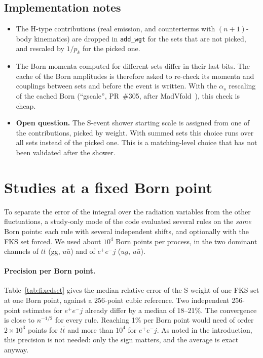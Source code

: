 \documentclass[11pt,a4paper]{article}
\newcommand{\code}[1]{\texttt{#1}}
\begin{document}
\subsection{Implementation notes}
\begin{itemize}
\item The H-type contributions (real emission, and counterterms with $(n{+}1)$-body kinematics)
are dropped in \code{add\_wgt} for the sets that are not picked, and rescaled by $1/p_k$ for
the picked one.
\item The Born momenta computed for different sets differ in their last bits. The cache of
the Born amplitudes is therefore asked to re-check its momenta and couplings between sets
and before the event is written. With the $\alpha_s$ rescaling of the cached Born
(``gscale'', PR~\#305, after MadVfold~\cite{Valassi:2026pgd}), this check is cheap.
\item \textbf{Open question.} The S-event shower starting scale is assigned from one of the
contributions, picked by weight. With summed sets this choice runs over all sets instead of
the picked one. This is a matching-level choice that has not been validated after the shower.
\end{itemize}

\section{Studies at a fixed Born point}
\label{sec:dumps}

To separate the error of the integral over the radiation variables from the other
fluctuations, a study-only mode of the code
evaluated several rules on the \emph{same} Born points: each rule with several independent
shifts, and optionally with the FKS set forced. We used about $10^4$ Born points per
process, in the two dominant channels of $t\bar t$ (gg, $u\bar u$) and of $e^+e^-j$ ($ug$,
$u\bar u$).

\paragraph{Precision per Born point.}
Table~\ref{tab:fixedset} gives the median relative error of the S weight of one FKS set at one
Born point, against a 256-point cubic reference. Two independent 256-point estimates for
$e^+e^-j$ already differ by a median of 18--21\%. The convergence is close to $n^{-1/2}$ for
every rule. Reaching 1\% per Born point would need of order $2\times10^3$ points for
$t\bar t$ and more than $10^4$ for $e^+e^-j$. As noted in the introduction, this precision is
not needed: only the sign matters, and the average is exact anyway.
\end{document}
